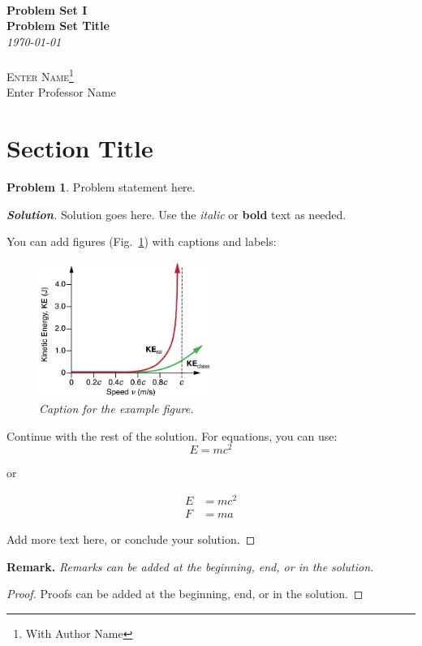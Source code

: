 \documentclass[12pt]{article}
\newcommand{\SheetTitle}[3]{
  {\noindent\Huge\bf  \\[0.5\baselineskip] {\fontfamily{cmr}\selectfont  Problem Set I}}\\[2\baselineskip] %
  { {\bf \fontfamily{cmr}\selectfont #1}\\ {\textit{\fontfamily{cmr}\selectfont \today}}}    ~~~~~~~~~~~~~~~~~~~~~~~~~~~~~~~~~~~~~~~~~~~~~~~~~~~~~~~~~~~~~~~~~~~~     {\large \textsc{Enter Name}\thanks{With #3}} \\
  {Enter Professor Name}
  \\[1.4\baselineskip]}
\theoremstyle{definition}
\newtheorem{p}{Problem}
\newenvironment{solution}
  {\begin{mdframed}[linewidth=0.5pt, roundcorner=10pt, linecolor=black]\begin{proof}[\bfseries Solution]}
  {\qedhere\end{proof}\end{mdframed}}
\newenvironment{remark}
  {\begin{mdframed}[linewidth=0.5pt, roundcorner=10pt, linecolor=black]
   \textbf{Remark.} \itshape}
  {\end{mdframed}}
\begin{document}
\SheetTitle{Problem Set Title}{Course Name}{Author Name}

\section{Section Title}

\vspace{0.9cm}
\begin{p}
  Problem statement here.
\end{p}

\begin{solution}
  Solution goes here. Use the \emph{italic} or \textbf{bold} text as needed.
  
  You can add figures (Fig.~\ref{fig:example}) with captions and labels:
  \begin{figure}[H]
    \centering
    \includegraphics[width=0.5\textwidth]{figures/example.jpg}
    \caption{\emph{Caption for the example figure.}}
    \label{fig:example}
  \end{figure}

  Continue with the rest of the solution. For equations, you can use:
  \begin{equation}
    E = mc^2
  \end{equation}

  or 

  \begin{align*}
    E &= mc^2 \\
    F &= ma
  \end{align*}

  
  Add more text here, or conclude your solution.

\end{solution}

\begin{remark}
  Remarks can be added at the beginning, end, or in the solution.
\end{remark}

\vspace{\lineskip}

\begin{proof}
  Proofs can be added at the beginning, end, or in the solution.
\end{proof}


\end{document}
